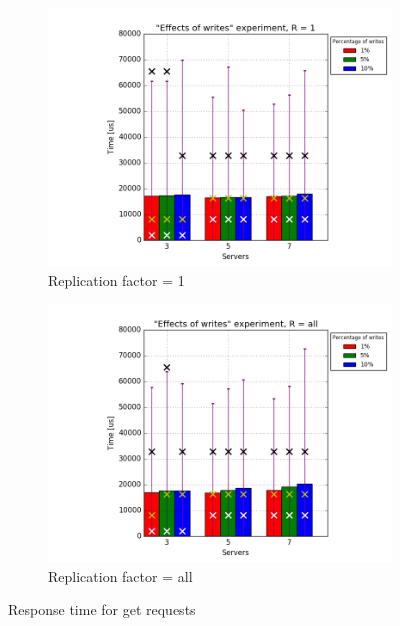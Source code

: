 \documentclass[11pt]{article}
\begin{document}
\begin{figure}
\centering
\begin{subfigure}{.5\textwidth}
	\centering
	\includegraphics[width=\linewidth]{plots/writes-response_time-get-1-replication}
	\caption{Replication factor = 1}
	\label{fig:writes-get-1}
\end{subfigure}%
\begin{subfigure}{.5\textwidth}
	\centering
	\includegraphics[width=\linewidth]{plots/writes-response_time-get-2-replication}
	\caption{Replication factor = all}
	\label{fig:writes-get-2}
\end{subfigure}
\caption{Response time for get requests}
\label{fig:writes-response-time-get}
\end{figure}
\end{document}
